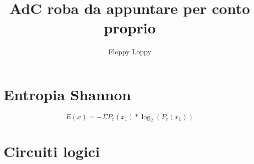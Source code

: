 \documentclass{article}
\begin{document}
\title{AdC roba da appuntare per conto proprio}
\author{Floppy Loppy}
\date{}
\maketitle
\tableofcontents
\newpage


\section{Entropia Shannon}

\begin{equation}
        E(x) = - \Sigma P_r(x_1) * \log_2(P_r(x_1))
\end{equation}


\section{Circuiti logici}
\end{document}
